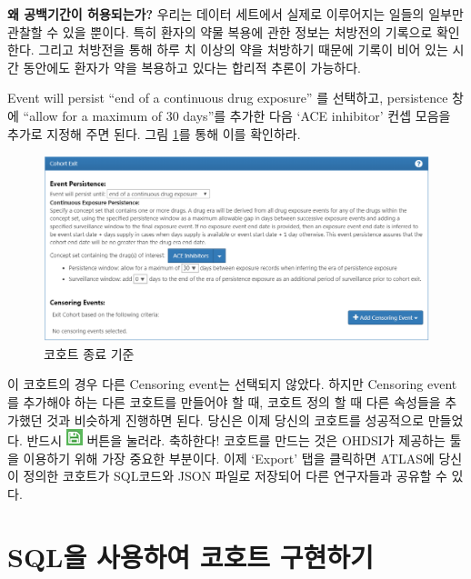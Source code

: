 \documentclass[11pt]{book}
\theoremstyle{definition}
\theoremstyle{definition}
\theoremstyle{definition}
\theoremstyle{remark}
\begin{document}
\textbf{왜 공백기간이 허용되는가?} 우리는 데이터 세트에서 실제로
이루어지는 일들의 일부만 관찰할 수 있을 뿐이다. 특히 환자의 약물 복용에
관한 정보는 처방전의 기록으로 확인한다. 그리고 처방전을 통해 하루 치
이상의 약을 처방하기 때문에 기록이 비어 있는 시간 동안에도 환자가 약을
복용하고 있다는 합리적 추론이 가능하다.

Event will persist ``end of a continuous drug exposure'' 를 선택하고,
persistence 창에 ``allow for a maximum of 30 days''를 추가한 다음 `ACE
inhibitor' 컨셉 모음을 추가로 지정해 주면 된다. 그림
\ref{fig:ATLAScohortexit}를 통해 이를 확인하라.

\begin{figure}

{\centering \includegraphics[width=1\linewidth]{images/Cohorts/cohort-exit} 

}

\caption{코호트 종료 기준}\label{fig:ATLAScohortexit}
\end{figure}

이 코호트의 경우 다른 Censoring event는 선택되지 않았다. 하지만
Censoring event를 추가해야 하는 다른 코호트를 만들어야 할 때, 코호트
정의 할 때 다른 속성들을 추가했던 것과 비슷하게 진행하면 된다. 당신은
이제 당신의 코호트를 성공적으로 만들었다. 반드시
\includegraphics{images/Cohorts/save.png} 버튼을 눌러라. 축하한다!
코호트를 만드는 것은 OHDSI가 제공하는 툴을 이용하기 위해 가장 중요한
부분이다. 이제 `Export' 탭을 클릭하면 ATLAS에 당신이 정의한 코호트가
SQL코드와 JSON 파일로 저장되어 다른 연구자들과 공유할 수 있다.

\section{SQL을 사용하여 코호트 구현하기}\label{sql---}
\end{document}
